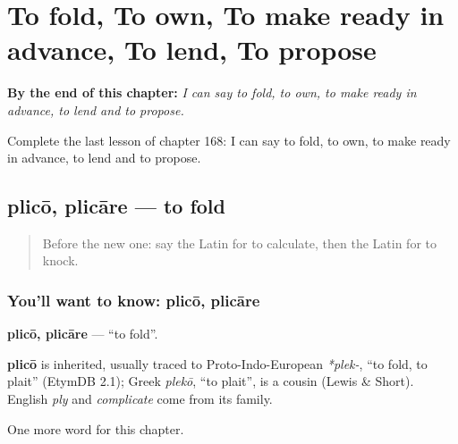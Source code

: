 
\chapter{To fold, To own, To make ready in advance, To lend, To propose}
\label{ch:la-to-fold-to-own-to-make-ready-in-advance-to-lend-to-propose}

\begin{chapteropening}
\textbf{By the end of this chapter:} \emph{I can say to fold, to own, to make ready in advance, to lend and to propose.}

Complete the last lesson of chapter 168: I can say to fold, to own, to make ready in advance, to lend and to propose.
\end{chapteropening}

\section[plicō, plicāre]{plicō, plicāre — to fold}

\label{lesson:LA-C168-plico}



\begin{quote}
Before the new one: say the Latin for to calculate, then the Latin for to knock.
\end{quote}

\subsection*{You'll want to know: plicō, plicāre}
\textbf{plicō, plicāre} — \textquotedblleft{}to fold\textquotedblright{}.

\begin{cousinweb}
\textbf{plicō} is inherited, usually traced to Proto-Indo-European \emph{*plek-}, \textquotedblleft{}to fold, to plait\textquotedblright{} (EtymDB 2.1); Greek \emph{plekō}, \textquotedblleft{}to plait\textquotedblright{}, is a cousin (Lewis \& Short). English \emph{ply} and \emph{complicate} come from its family.
\end{cousinweb}

\begin{grammarlens}[title={What you've built}]
One more word for this chapter.
\end{grammarlens}

